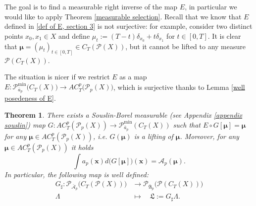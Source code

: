 \documentclass[10pt,leqno]{amsart}
\numberwithin{equation}{section}
\newtheorem{teorema}{Theorem}[section]
\newcommand{\PP}{\mathcal{P}}
\begin{document}
The goal is to find a measurable right inverse of the map $E$, in particular we would like to apply Theorem \ref{measurable selection}. Recall that we know that 
$E$ defined in \eqref{def of E, section 3}
is not surjective: for example, consider two distinct points $x_0,x_1\in X$ and define $\mu_t:= (T-t)\delta_{x_0} + t \delta_{x_1}$ for $t\in [0,T]$. It is clear that $\boldsymbol{\mu}= (\mu_t)_{t\in [0,T]} \in C_T(\PP(X))$, but it cannot be lifted to any measure $\PP(C_T(X))$.

The situation is nicer if we restrict $E$ as a map $E:\PP_{\overline{a}_p}^{\operatorname{min}}\big(C_T(X)\big)  \to AC^p_T \big
(\PP_p(X)\big)$, which is surjective thanks to Lemma \ref{well posedeness of E}.



\begin{teorema}\label{metric theorem from Lambda to mathfrak{L}}
    There exists a Souslin-Borel measurable (see Appendix \ref{appendix souslin}) map $G:AC_T^p(\PP_p(X))\to \PP_{\bar{a}_p}^{\operatorname{min}}(C_T(X))$ such that $E\circ G[\boldsymbol{\mu}] = \boldsymbol{\mu}$ for any $\boldsymbol{\mu}\in AC_T^p(\PP_p(X))$, i.e. $G(\boldsymbol{\mu})$ is a lifting of $\boldsymbol{\mu}$. Moreover, for any $\boldsymbol{\mu}\in AC^p_T(\PP_p(X))$ it holds
    \begin{equation}\label{minimal meas selection}
        \int a_p(\boldsymbol{x}) d\big(G[\boldsymbol{\mu}]\big)(\boldsymbol{x}) = \mathcal{A}_p(\boldsymbol{\mu}).
    \end{equation}
    In particular, the following map is well defined: 
    \begin{equation}\label{min energy lifting equation}
    \begin{aligned}
        G_\sharp  : \mathcal{P}_{\bar{\mathcal{A}}_p}\big(C_T(\mathcal{P}(X))\big)& \to \mathcal{P}_{\bar{\mathfrak{A}}_p}\big(\mathcal{P}(C_T(X))\big)
        \\
        \Lambda\quad & \mapsto \quad  \mathfrak{L}:= G_{\sharp }\Lambda.
    \end{aligned}
    \end{equation}
\end{teorema}
\end{document}
